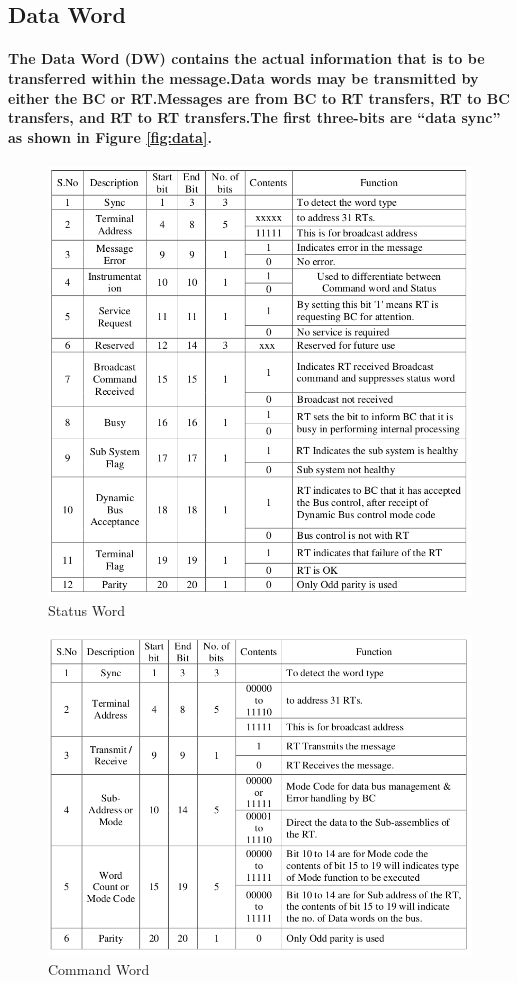 \documentclass[12pt,a4paper]{report}
\begin{document}
\subsection{Data Word}
\paragraph{\textrm{\textmd{ The Data Word (DW) contains the actual information that is to be transferred within the message.Data words may be transmitted by either the BC or RT.Messages are from BC to RT transfers, RT to BC transfers, and RT to RT transfers.The first three-bits are “data sync” as shown in Figure \ref{fig:data}.}}}
\begin{figure}[h]
	\centering
	\includegraphics[scale=.38]{status.png}
	\caption{Status Word}
	\label{fig:sts}
\end{figure}
\begin{figure}[h]
	\centering
	\includegraphics[scale=.38]{command.png}
	\caption{Command Word}
	\label{fig:cmd}
\end{figure}
\end{document}
